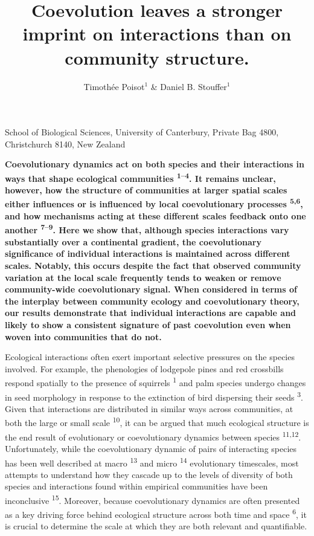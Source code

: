 \documentclass{nature}
\title{Coevolution leaves a stronger imprint on interactions than on community structure.}
\author{Timoth\'ee Poisot$^{1}$ \& Daniel B. Stouffer$^1$}
\begin{document}
\maketitle

\begin{affiliations}
 \item School of Biological Sciences, University of Canterbury, Private Bag 4800, Christchurch 8140, New Zealand
\end{affiliations}

\textbf{Coevolutionary dynamics act on both species and their interactions
in ways that shape ecological communities \textsuperscript{1--4}. It
remains unclear, however, how the structure of communities at larger
spatial scales either influences or is influenced by local coevolutionary
processes \textsuperscript{5,6}, and how mechanisms acting at these different
scales feedback onto one another \textsuperscript{7--9}. Here we show that,
although species interactions vary substantially over a continental gradient,
the coevolutionary significance of individual interactions is maintained
across different scales. Notably, this occurs despite the fact that observed
community variation at the local scale frequently tends to weaken or remove
community-wide coevolutionary signal. When considered in terms of the interplay
between community ecology and coevolutionary theory, our results demonstrate
that individual interactions are capable and likely to show a consistent
signature of past coevolution even when woven into communities that do not.}

Ecological interactions often exert important selective pressures on the
species involved. For example, the phenologies of lodgepole pines and red
crossbills respond spatially to the presence of squirrels \textsuperscript{1}
and palm species undergo changes in seed morphology in response to the
extinction of bird dispersing their seeds \textsuperscript{3}. Given that
interactions are distributed in similar ways across communities, at both
the large or small scale \textsuperscript{10}, it can be argued that much
ecological structure is the end result of evolutionary or coevolutionary
dynamics between species \textsuperscript{11,12}. Unfortunately, while
the coevolutionary dynamic of pairs of interacting species has been well
described at macro \textsuperscript{13} and micro \textsuperscript{14}
evolutionary timescales, most attempts to understand how they cascade up
to the levels of diversity of both species and interactions found within
empirical communities have been inconclusive \textsuperscript{15}.  Moreover,
because coevolutionary dynamics are often presented as a key driving force
behind ecological structure across both time and space \textsuperscript{6},
it is crucial to determine the scale at which they are both relevant and
quantifiable.
\end{document}
